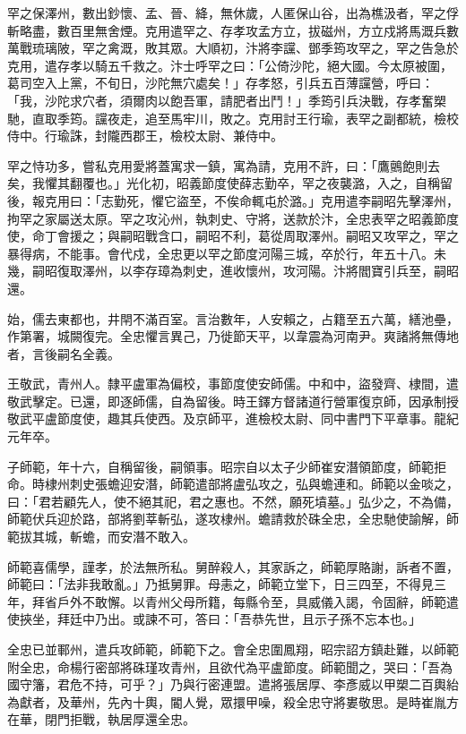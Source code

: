 \begin{pinyinscope}
 罕之保澤州，數出鈔懷、孟、晉、絳，無休歲，人匿保山谷，出為樵汲者，罕之俘斬略盡，數百里無舍煙。克用遣罕之、存孝攻孟方立，拔磁州，方立戍將馬溉兵數萬戰琉璃陂，罕之禽溉，敗其眾。大順初，汴將李讜、鄧季筠攻罕之，罕之告急於克用，遣存孝以騎五千救之。汴士呼罕之曰：「公倚沙陀，絕大國。今太原被圍，葛司空入上黨，不旬日，沙陀無穴處矣！」存孝怒，引兵五百薄讜營，呼曰：「我，沙陀求穴者，須爾肉以飽吾軍，請肥者出鬥！」季筠引兵決戰，存孝奮槊馳，直取季筠。讜夜走，追至馬牢川，敗之。克用討王行瑜，表罕之副都統，檢校侍中。行瑜誅，封隴西郡王，檢校太尉、兼侍中。



 罕之恃功多，嘗私克用愛將蓋寓求一鎮，寓為請，克用不許，曰：「鷹鸇飽則去矣，我懼其翻覆也。」光化初，昭義節度使薛志勤卒，罕之夜襲潞，入之，自稱留後，報克用曰：「志勤死，懼它盜至，不俟命輒屯於潞。」克用遣李嗣昭先擊澤州，拘罕之家屬送太原。罕之攻沁州，執刺史、守將，送款於汴，全忠表罕之昭義節度使，命丁會援之；與嗣昭戰含口，嗣昭不利，葛從周取澤州。嗣昭又攻罕之，罕之暴得病，不能事。會代戍，全忠更以罕之節度河陽三城，卒於行，年五十八。未幾，嗣昭復取澤州，以李存璋為刺史，進收懷州，攻河陽。汴將閻寶引兵至，嗣昭還。



 始，儒去東都也，井閈不滿百室。言治數年，人安賴之，占籍至五六萬，繕池壘，作第署，城闕復完。全忠懼言異己，乃徙節天平，以韋震為河南尹。爽諸將無傳地者，言後嗣名全義。



 王敬武，青州人。隸平盧軍為偏校，事節度使安師儒。中和中，盜發齊、棣間，遣敬武擊定。已還，即逐師儒，自為留後。時王鐸方督諸道行營軍復京師，因承制授敬武平盧節度使，趣其兵使西。及京師平，進檢校太尉、同中書門下平章事。龍紀元年卒。



 子師範，年十六，自稱留後，嗣領事。昭宗自以太子少師崔安潛領節度，師範拒命。時棣州刺史張蟾迎安潛，師範遣部將盧弘攻之，弘與蟾連和。師範以金啖之，曰：「君若顧先人，使不絕其祀，君之惠也。不然，願死墳墓。」弘少之，不為備，師範伏兵迎於路，部將劉莘斬弘，遂攻棣州。蟾請救於硃全忠，全忠馳使諭解，師範拔其城，斬蟾，而安潛不敢入。



 師範喜儒學，謹孝，於法無所私。舅醉殺人，其家訴之，師範厚賂謝，訴者不置，師範曰：「法非我敢亂。」乃抵舅罪。母恚之，師範立堂下，日三四至，不得見三年，拜省戶外不敢懈。以青州父母所籍，每縣令至，具威儀入謁，令固辭，師範遣使挾坐，拜廷中乃出。或諫不可，答曰：「吾恭先世，且示子孫不忘本也。」



 全忠已並鄆州，遣兵攻師範，師範下之。會全忠圍鳳翔，昭宗詔方鎮赴難，以師範附全忠，命楊行密部將硃瑾攻青州，且欲代為平盧節度。師範聞之，哭曰：「吾為國守籓，君危不持，可乎？」乃與行密連盟。遣將張居厚、李彥威以甲槊二百輿紿為獻者，及華州，先內十輿，閽人覺，眾擐甲噪，殺全忠守將婁敬思。是時崔胤方在華，閉門拒戰，執居厚還全忠。




\end{pinyinscope}
